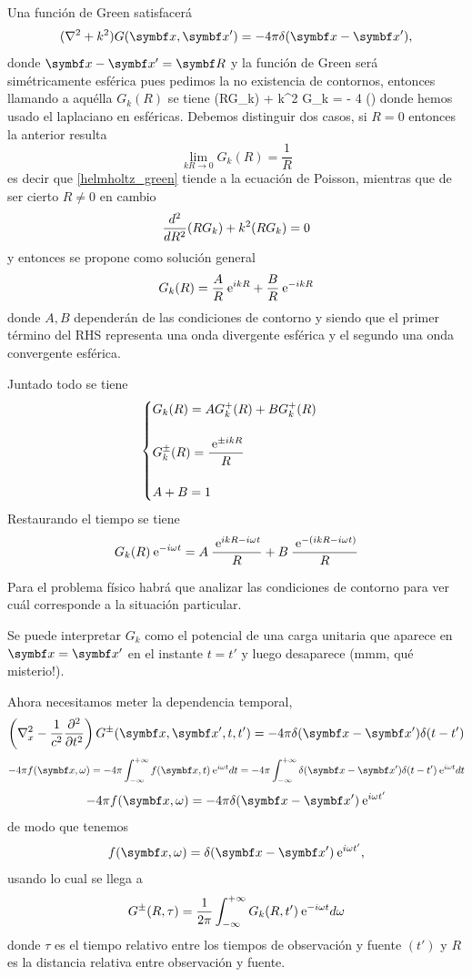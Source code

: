 \documentclass[10pt,oneside]{CBFT_book}
\begin{document}
Una función de Green satisfacerá 
\[
	(\nabla^2 + k^2) G(\vb{x},\vb{x}') = - 4\pi \delta(\vb{x}-\vb{x}'),
\]
donde $\vb{x}-\vb{x}' = \vb{R}$ y la función de Green será simétricamente esférica pues pedimos la
no existencia de contornos, entonces llamando a aquélla $G_k(R)$ se tiene 
\be
	(RG_k) + k^2 G_k = - 4 \pi \delta ()
	\label{helmholtz_green}
\ee
donde hemos usado el laplaciano en esféricas. Debemos distinguir dos casos, si $R=0$ entonces la
anterior resulta 
\[
	\lim_{kR \to 0} G_k(R) = \frac{1}{R}
\]
es decir que \eqref{helmholtz_green} tiende a la ecuación de Poisson, 
mientras que de ser cierto $R\neq 0$ en cambio
\[
	\dtot[2]{}{R}(RG_k) + k^2 (RG_k) = 0
\]
y entonces se propone como solución general 
\[
	G_k(R) = \frac{ A }{ R } \euler^{ i k R } + \frac{ B }{ R } \euler^{ -i k R }
\]
donde $A, B$ dependerán de las condiciones de contorno y siendo que el primer término del RHS representa
una onda divergente esférica y el segundo una onda convergente esférica.

Juntado todo se tiene
\[
	\begin{cases}
	G_k(R) = A G_k^+(R) +  B G_k^+(R) \\
	\\
	\displaystyle G_k^{\pm}(R) = \frac{\euler^{ \pm i k R}}{R}  \\
	\\
	A + B = 1
	\end{cases}
\]
Restaurando el tiempo se tiene
\[
	G_k(R)\euler^{- i \omega t } = 
	A \: \frac{\euler^{ i k R - i \omega t }}{R} + 
	B \: \frac{\euler^{ - ( i k R - i \omega t )}}{R}
\]

Para el problema físico habrá que analizar las condiciones de contorno para ver cuál corresponde
a la situación particular.

Se puede interpretar $G_k$ como el potencial de una carga unitaria que aparece en $\vb{x}=\vb{x}'$ en el
instante $t=t'$ y luego desaparece (mmm, qué misterio!).

Ahora necesitamos meter la dependencia temporal,
\[
	\left(\nabla^2_x - \frac{1}{c^2}\dpar[2]{}{t} \right) G^{\pm}(\vb{x},\vb{x}',t,t') = 
	- 4 \pi \delta(\vb{x}-\vb{x}') \delta(t-t')
\]
\[
	- 4 \pi f(\vb{x},\omega) = -4 \pi \int_{-\infty}^{+\infty} f(\vb{x},t) \euler^{i\omega t} dt =
		-4 \pi \int_{-\infty}^{+\infty} \delta(\vb{x}-\vb{x}') \delta(t-t') \euler^{i\omega t} dt
\]
\[
	- 4 \pi f(\vb{x},\omega) = -4 \pi \delta(\vb{x}-\vb{x}') \euler^{i\omega t'} 
\]
de modo que tenemos 
\[
	f(\vb{x},\omega) = \delta(\vb{x}-\vb{x}') \euler^{i\omega t'} ,
\]
usando lo cual se llega a
\[
	G^{\pm}(R,\tau) = \frac{1}{2\pi} \int_{-\infty}^{+\infty} G_k(R,t') \euler^{-i\omega t} d\omega
\]
donde $\tau$ es el tiempo relativo entre los tiempos de observación y fuente $(t')$ y $R$ es la distancia 
relativa entre observación y fuente.
\end{document}
